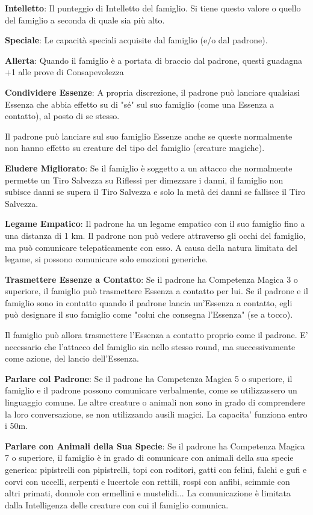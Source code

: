 \documentclass[a4paper,11pt,twoside,openany]{book}
\begin{document}
\textbf{Intelletto}: Il punteggio di Intelletto del famiglio. Si tiene questo valore o quello del famiglio a seconda di quale sia più alto.

\textbf{Speciale}: Le capacità speciali acquisite dal famiglio (e/o dal padrone).

\textbf{Allerta}: Quando il famiglio è a portata di braccio dal padrone, questi guadagna +1 alle prove di Consapevolezza

\textbf{Condividere Essenze}: A propria discrezione, il padrone può lanciare qualsiasi Essenza che abbia effetto su di "sé" sul suo famiglio (come una Essenza a contatto), al posto di se stesso.

Il padrone può lanciare sul suo famiglio Essenze anche se queste normalmente non hanno effetto su creature del tipo del famiglio (creature magiche).

\textbf{Eludere Migliorato}: Se il famiglio è soggetto a un attacco che normalmente permette un Tiro Salvezza su Riflessi per dimezzare i danni, il famiglio non subisce danni se supera il Tiro Salvezza e solo la metà dei danni se fallisce il Tiro Salvezza.

\textbf{Legame Empatico}: Il padrone ha un legame empatico con il suo famiglio fino a una distanza di 1 km. Il padrone non può vedere attraverso gli occhi del famiglio, ma può comunicare telepaticamente con esso. A causa della natura limitata del legame, si possono comunicare solo emozioni generiche.

\textbf{Trasmettere Essenze a Contatto}: Se il padrone ha Competenza Magica 3 o superiore, il famiglio può trasmettere Essenza a contatto per lui. Se il padrone e il famiglio sono in contatto quando il padrone lancia un'Essenza a contatto, egli può designare il suo famiglio come "colui che consegna l'Essenza" (se a tocco).

Il famiglio può allora trasmettere l'Essenza a contatto proprio come il padrone. E' necessario che l'attacco del famiglio sia nello stesso round, ma successivamente come azione, del lancio dell'Essenza.

\textbf{Parlare col Padrone}: Se il padrone ha Competenza Magica 5 o superiore, il famiglio e il padrone possono comunicare verbalmente, come se utilizzassero un linguaggio comune. Le altre creature o animali non sono in grado di comprendere la loro conversazione, se non utilizzando ausili magici. La capacita' funziona entro i 50m.

\textbf{Parlare con Animali della Sua Specie}: Se il padrone ha Competenza Magica 7 o superiore, il famiglio è in grado di comunicare con animali della sua specie generica: pipistrelli con pipistrelli, topi con roditori, gatti con felini, falchi e gufi e corvi con uccelli, serpenti e lucertole con rettili, rospi con anfibi, scimmie con altri primati, donnole con ermellini e mustelidi... La comunicazione è limitata dalla Intelligenza delle creature con cui il famiglio comunica.
\end{document}
